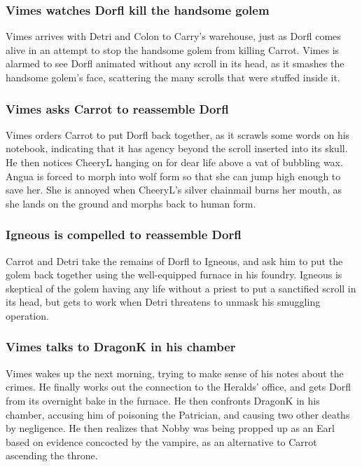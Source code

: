\subsubsection{\Gls{Vimes} watches \Gls{Dorfl} kill the handsome golem}
\Gls{Vimes} arrives with \Gls{Detri} and \Gls{Colon} to \Gls{Carry}'s warehouse, just as \Gls{Dorfl}
comes alive in an attempt to stop the handsome golem from killing \Gls{Carrot}. \Gls{Vimes} is
alarmed to see \Gls{Dorfl} animated without any scroll in its head, as it smashes the handsome
golem's face, scattering the many scrolls that were stuffed inside it.

\subsubsection{\Gls{Vimes} asks \Gls{Carrot} to reassemble \Gls{Dorfl}}
\Gls{Vimes} orders \Gls{Carrot} to put \Gls{Dorfl} back together, as it scrawls some words on his
notebook, indicating that it has agency beyond the scroll inserted into its skull. He then notices
\Gls{CheeryL} hanging on for dear life above a vat of bubbling wax. \Gls{Angua} is forced to morph
into wolf form so that she can jump high enough to save her. She is annoyed when \Gls{CheeryL}'s
silver chainmail burns her mouth, as she lands on the ground and morphs back to human form.

\subsubsection{\Gls{Igneous} is compelled to reassemble \Gls{Dorfl}}
\Gls{Carrot} and \Gls{Detri} take the remains of \Gls{Dorfl} to \Gls{Igneous}, and ask him to put
the golem back together using the well-equipped furnace in his foundry. \Gls{Igneous} is skeptical
of the golem having any life without a priest to put a sanctified scroll in its head, but gets to
work when \Gls{Detri} threatens to unmask his smuggling operation.

\subsubsection{\Gls{Vimes} talks to \Gls{DragonK} in his chamber}
\Gls{Vimes} wakes up the next morning, trying to make sense of his notes about the crimes. He
finally works out the connection to the Heralds' office, and gets \Gls{Dorfl} from its overnight
bake in the furnace. He then confronts \Gls{DragonK} in his chamber, accusing him of poisoning the
Patrician, and causing two other deaths by negligence. He then realizes that \Gls{Nobby} was being
propped up as an Earl based on evidence concocted by the vampire, as an alternative to \Gls{Carrot}
ascending the throne.

